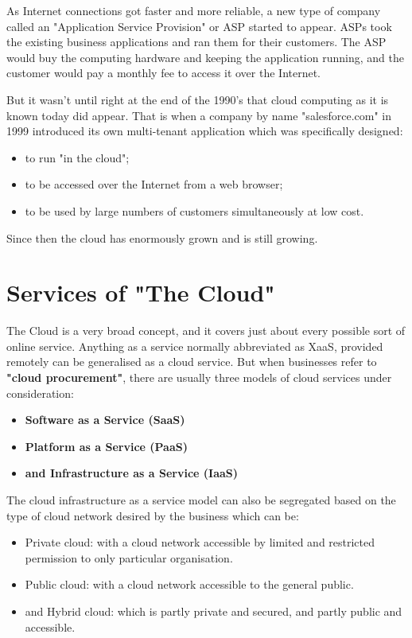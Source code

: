 As Internet connections got faster and more reliable, a new type of company called an "Application Service Provision" or ASP started to appear. ASPs took the existing business applications and ran them for their customers. The ASP would buy the computing hardware and keeping the application running, and the customer would pay a monthly fee to access it over the Internet.

But it wasn't until right at the end of the 1990's that cloud computing as it is known today did appear. That is when a company by name "salesforce.com" in 1999 introduced its own multi-tenant application which was specifically designed:
\begin{itemize}
	\item to run "in the cloud";
	\item to be accessed over the Internet from a web browser;
	\item to be used by large numbers of customers simultaneously at low cost.
\end{itemize}
Since then the cloud has enormously grown and is still growing.

\section{Services of "The Cloud"\cite{IBMcloud}}\label{sec:service_models}
The Cloud is a very broad concept, and it covers just about every possible sort of online service. Anything as a service normally abbreviated as XaaS, provided remotely can be generalised as a cloud service. But when businesses refer to \textbf{"cloud procurement"}, there are usually three models of cloud services under consideration:
\begin{itemize}
	\item \textbf{Software as a Service (SaaS)}
	\item \textbf{Platform as a Service (PaaS)}
	\item \textbf{and Infrastructure as a Service (IaaS)}
\end{itemize}

The cloud infrastructure as a service model can also be segregated based on the type of cloud network desired by the business which can be:
\begin{itemize}
	\item Private cloud: with a cloud network accessible by limited and restricted permission to only particular organisation.
	\item Public cloud: with a cloud network accessible to the general public.
	\item and Hybrid cloud: which is partly private and secured, and partly public and accessible.
\end{itemize}

